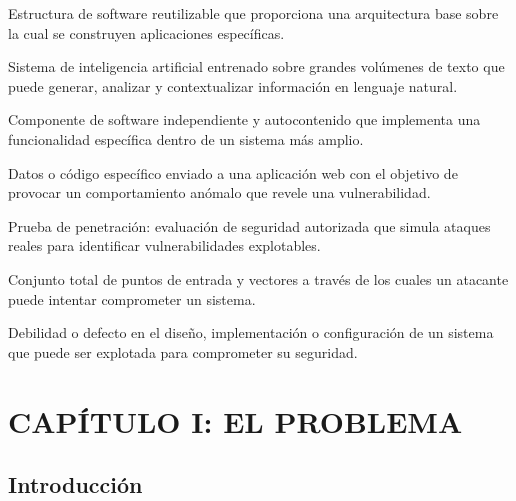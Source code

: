 \documentclass[12pt, a4paper]{article}
\begin{document}
\begin{description}[style=nextline, leftmargin=1.5cm]
    \item[\textbf{Framework}] Estructura de software reutilizable que proporciona
    una arquitectura base sobre la cual se construyen aplicaciones específicas.

    \item[\textbf{Modelo de lenguaje (LLM)}] Sistema de inteligencia artificial
    entrenado sobre grandes volúmenes de texto que puede generar, analizar y
    contextualizar información en lenguaje natural.

    \item[\textbf{Módulo}] Componente de software independiente y autocontenido
    que implementa una funcionalidad específica dentro de un sistema más amplio.

    \item[\textbf{Payload}] Datos o código específico enviado a una aplicación
    web con el objetivo de provocar un comportamiento anómalo que revele una
    vulnerabilidad.

    \item[\textbf{Pentesting}] Prueba de penetración: evaluación de seguridad
    autorizada que simula ataques reales para identificar vulnerabilidades
    explotables.

    \item[\textbf{Superficie de ataque}] Conjunto total de puntos de entrada
    y vectores a través de los cuales un atacante puede intentar comprometer
    un sistema.

    \item[\textbf{Vulnerabilidad}] Debilidad o defecto en el diseño,
    implementación o configuración de un sistema que puede ser explotada para
    comprometer su seguridad.
\end{description}

\newpage
{}

\section{CAPÍTULO I: EL PROBLEMA}

\subsection{Introducción}
\end{document}
